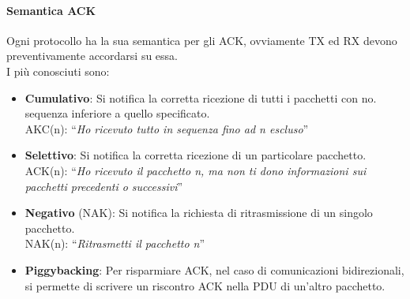 \documentclass[12pt]{article}
\begin{document}
\paragraph{Semantica ACK}
Ogni protocollo ha la sua semantica per gli ACK, ovviamente TX ed RX devono preventivamente accordarsi su essa.\\
I più conosciuti sono:
\begin{itemize}
  \item \textbf{Cumulativo}: Si notifica la corretta ricezione di tutti i pacchetti con no. sequenza inferiore a quello specificato.\\
  AKC(n): ``\textit{Ho ricevuto tutto in sequenza fino ad n escluso}''
  \item \textbf{Selettivo}: Si notifica la corretta ricezione di un particolare pacchetto.\\
  ACK(n): ``\textit{Ho ricevuto il pacchetto n, ma non ti dono informazioni sui pacchetti precedenti o successivi}''
  \item \textbf{Negativo} (NAK): Si notifica la richiesta di ritrasmissione di un singolo pacchetto.\\
  NAK(n): ``\textit{Ritrasmetti il pacchetto n}''
  \item \textbf{Piggybacking}: Per risparmiare ACK, nel caso di comunicazioni bidirezionali, si permette di scrivere un riscontro ACK nella PDU di un'altro pacchetto.
\end{itemize}
\end{document}

